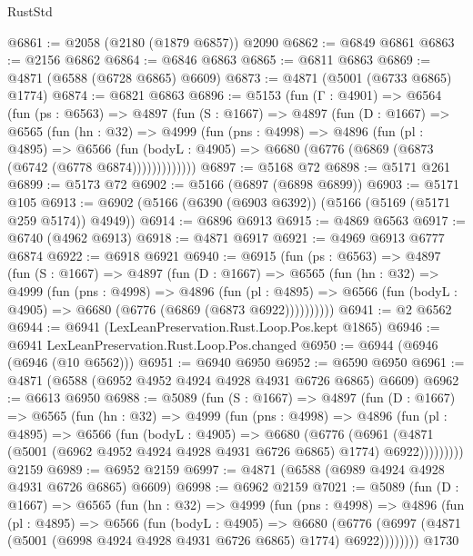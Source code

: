 \begin{lexlean}{RustStd}
\begin{coremodule}
@6861 := @2058 (@2180 (@1879 @6857)) @2090
@6862 := @6849 @6861
@6863 := @2156 @6862
@6864 := @6846 @6863
@6865 := @6811 @6863
@6869 := @4871 (@6588 (@6728 @6865) @6609)
@6873 := @4871 (@5001 (@6733 @6865) @1774)
@6874 := @6821 @6863
@6896 := @5153
    (fun (Γ : @4901) =>
    @6564
      (fun (ps : @6563) =>
      @4897
        (fun (S : @1667) =>
        @4897
          (fun (D : @1667) =>
          @6565
            (fun (hn : @32) =>
            @4999
              (fun (pns : @4998) =>
              @4896
                (fun (pl : @4895) =>
                @6566
                  (fun (bodyL : @4905) =>
                  @6680 (@6776 (@6869 (@6873 (@6742 (@6778 @6874)))))))))))))
@6897 := @5168 @72
@6898 := @5171 @261
@6899 := @5173 @72
@6902 := @5166 (@6897 (@6898 @6899))
@6903 := @5171 @105
@6913 := @6902 (@5166 (@6390 (@6903 @6392)) (@5166 (@5169 (@5171 @259 @5174)) @4949))
@6914 := @6896 @6913
@6915 := @4869 @6563
@6917 := @6740 (@4962 @6913)
@6918 := @4871 @6917
@6921 := @4969 @6913 @6777 @6874
@6922 := @6918 @6921
@6940 := @6915
    (fun (ps : @6563) =>
    @4897
      (fun (S : @1667) =>
      @4897
        (fun (D : @1667) =>
        @6565
          (fun (hn : @32) =>
          @4999
            (fun (pns : @4998) =>
            @4896
              (fun (pl : @4895) =>
              @6566 (fun (bodyL : @4905) => @6680 (@6776 (@6869 (@6873 @6922))))))))))
@6941 := @2 @6562
@6944 := @6941 (LexLeanPreservation.Rust.Loop.Pos.kept @1865)
@6946 := @6941 LexLeanPreservation.Rust.Loop.Pos.changed
@6950 := @6944 (@6946 (@6946 (@10 @6562)))
@6951 := @6940 @6950
@6952 := @6590 @6950
@6961 := @4871 (@6588 (@6952 @4952 @4924 @4928 @4931 @6726 @6865) @6609)
@6962 := @6613 @6950
@6988 := @5089
    (fun (S : @1667) =>
    @4897
      (fun (D : @1667) =>
      @6565
        (fun (hn : @32) =>
        @4999
          (fun (pns : @4998) =>
          @4896
            (fun (pl : @4895) =>
            @6566
              (fun (bodyL : @4905) =>
              @6680
                (@6776
                  (@6961
                    (@4871 (@5001 (@6962 @4952 @4924 @4928 @4931 @6726 @6865) @1774) @6922)))))))))
    @2159
@6989 := @6952 @2159
@6997 := @4871 (@6588 (@6989 @4924 @4928 @4931 @6726 @6865) @6609)
@6998 := @6962 @2159
@7021 := @5089
    (fun (D : @1667) =>
    @6565
      (fun (hn : @32) =>
      @4999
        (fun (pns : @4998) =>
        @4896
          (fun (pl : @4895) =>
          @6566
            (fun (bodyL : @4905) =>
            @6680
              (@6776 (@6997 (@4871 (@5001 (@6998 @4924 @4928 @4931 @6726 @6865) @1774) @6922))))))))
    @1730

\end{coremodule}
\end{lexlean}
